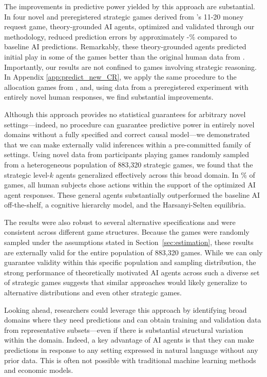 \documentclass[11pt]{article}
\theoremstyle{definition}
\newcommand{\aisub}{AI agent}
\newcommand{\TotalGames}{883,320}
\begin{document}
The improvements in predictive power yielded by this approach are substantial. 
In four novel and preregistered strategic games derived from \citeauthor{1120Arad2012}'s 11-20 money request game, theory-grounded \aisub{s}, optimized and validated through our methodology, reduced prediction errors by approximately \MinPercImproveArad-\MaxPercImproveArad\% compared to baseline AI predictions. 
Remarkably, these theory-grounded agents predicted initial play in some of the games better than the original human data from \citeauthor{1120Arad2012}. 
Importantly, our results are not confined to games involving strategic reasoning.
In Appendix \ref{app:predict_new_CR}, we apply the same procedure to the allocation games from \citeauthor{charness2002understanding}, and, using data from a preregistered experiment with entirely novel human responses, we find substantial improvements.

Although this approach provides no statistical guarantees for arbitrary novel settings---indeed, no procedure can guarantee predictive power in entirely novel domains without a fully specified and correct causal model---we demonstrated that we can make externally valid inferences within a pre-committed family of settings.
Using novel data from \SampleSizeHuman{} participants playing \SampleSizeGame{} games randomly sampled from a heterogeneous population of \TotalGames{} strategic games, we found that the strategic level-$k$ agents generalized effectively across this broad domain.
In \OptGameAllMatchRate\% of games, all human subjects chose actions within the support of the optimized \aisub{} responses. 
These general agents substantially outperformed the baseline AI off-the-shelf, a cognitive hierarchy model, and the Harsanyi-Selten equilibria.

The results were also robust to several alternative specifications and were consistent across different game structures.
Because the games were randomly sampled under the assumptions stated in Section~\ref{sec:estimation}, these results are externally valid for the entire population of \TotalGames{} games.
While we can only guarantee validity within this specific population and sampling distribution, the strong performance of theoretically motivated \aisub{s} across such a diverse set of strategic games suggests that similar approaches would likely generalize to alternative distributions and even other strategic games.

Looking ahead, researchers could leverage this approach by identifying broad domains where they need predictions and can obtain training and validation data from representative subsets---even if there is substantial structural variation within the domain.
Indeed, a key advantage of \aisub{s} is that they can make predictions in response to any setting expressed in natural language without any prior data.
This is often not possible with traditional machine learning methods and economic models.
\end{document}
